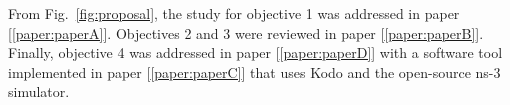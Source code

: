From Fig.~\ref{fig:proposal}, the study for objective 1 was addressed in paper {[\ref{paper:paperA}]}. Objectives 2 and 3 were reviewed in paper {[\ref{paper:paperB}]}. Finally, objective 4 was addressed in paper {[\ref{paper:paperD}]} with a software tool implemented in paper {[\ref{paper:paperC}]} that uses Kodo and the open-source ns-3 simulator.

